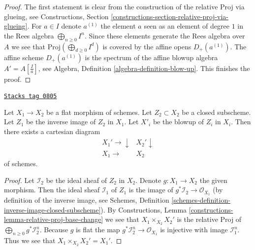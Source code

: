 \begin{proof}
The first statement is clear from the construction of the relative Proj via
glueing, see Constructions, Section
\ref{constructions-section-relative-proj-via-glueing}.
For $a \in I$ denote $a^{(1)}$ the element $a$ seen as an element of
degree $1$ in the Rees algebra $\bigoplus_{n \geq 0} I^n$.
Since these elements generate the Rees algebra over $A$ we see that
$\text{Proj}(\bigoplus_{d \geq 0} I^d)$ is covered by the affine opens
$D_{+}(a^{(1)})$. The affine scheme $D_{+}(a^{(1)})$ is the spectrum of
the affine blowup algebra $A' = A[\frac{I}{a}]$, see
Algebra, Definition \ref{algebra-definition-blow-up}.
This finishes the proof.
\end{proof}

\begin{lemma}
\label{divisors-lemma-flat-base-change-blowing-up}
\href{https://stacks.math.columbia.edu/tag/0805}{\texttt{Stacks tag 0805}}


Let $X_1 \to X_2$ be a flat morphism of schemes. Let $Z_2 \subset X_2$ be a
closed subscheme. Let $Z_1$ be the inverse image of $Z_2$ in $X_1$.
Let $X'_i$ be the blowup of $Z_i$ in $X_i$. Then there exists a cartesian
diagram
$$
\begin{array}{cc}X_1' \longrightarrow\downarrow & X_2' \downarrow \\ X_1 \longrightarrow & X_2\end{array}
$$
of schemes.
\end{lemma}

\begin{proof}
Let $\mathcal{I}_2$ be the ideal sheaf of $Z_2$ in $X_2$.
Denote $g : X_1 \to X_2$ the given morphism. Then the ideal sheaf
$\mathcal{I}_1$ of $Z_1$ is the image of
$g^*\mathcal{I}_2 \to \mathcal{O}_{X_1}$
(by definition of the inverse image, see
Schemes, Definition \ref{schemes-definition-inverse-image-closed-subscheme}).
By Constructions, Lemma \ref{constructions-lemma-relative-proj-base-change}
we see that $X_1 \times_{X_2} X_2'$ is the relative Proj of
$\bigoplus_{n \geq 0} g^*\mathcal{I}_2^n$. Because $g$ is flat the map
$g^*\mathcal{I}_2^n \to \mathcal{O}_{X_1}$ is injective with image
$\mathcal{I}_1^n$. Thus we see that $X_1 \times_{X_2} X_2' = X_1'$.
\end{proof}

